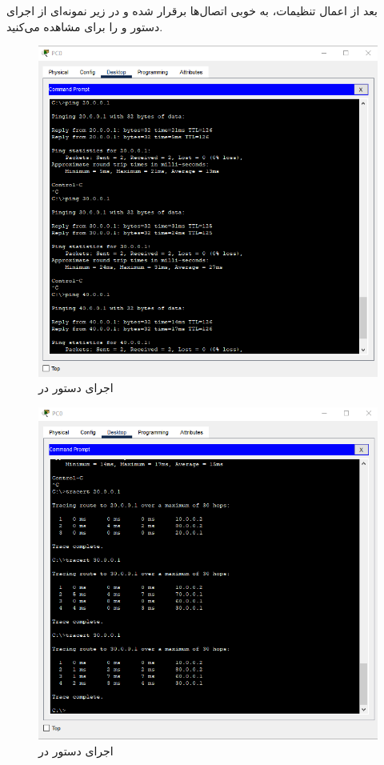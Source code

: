 \documentclass[12pt]{article}
\begin{document}
بعد از اعمال تنظیمات، به خوبی اتصال‌ها برقرار شده و در زیر نمونه‌ای از اجرای دستور  و  را برای  مشاهده می‌کنید.

\begin{figure}[H]
	\centering
	\includegraphics[scale=0.4]{images/rip/7.png}
	\caption{اجرای دستور  در } 
	\label{ripping}
\end{figure}

\begin{figure}[H]
	\centering
	\includegraphics[scale=0.4]{images/rip/9.png}
	\caption{اجرای دستور  در } 
	\label{showiprip}
\end{figure}
\end{document}
